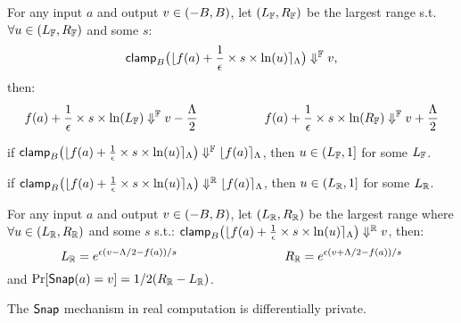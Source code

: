 \documentclass[a4paper,11pt]{article}
\begin{document}
\begin{lem}[roundRL]
\label{lem:roundrl}
For any input $a$ and output $v \in (-B, B)$,
let $(L_{\mathbb{F}}, R_{\mathbb{F}})$ be the largest range s.t. 
$\forall u \in (L_{\mathbb{F}}, R_{\mathbb{F}})$ and some $s$:
%
$$
\mathsf{clamp}_B \big(
	\lfloor f(a) + \frac{1}{\epsilon} \times s \times \ln (u) \rceil_{\Lambda}
	\big)
	\Downarrow^{\mathbb{F}} v,$$
then:
$$
f(a) + \frac{1}{\epsilon} \times s \times 
\ln (L_{\mathbb{F}})
\Downarrow^{\mathbb{F}} v - \frac{\Lambda}{2}
~~~~~~~~~~~~~~~~
f(a) + \frac{1}{\epsilon} \times s \times 
\ln (R_{\mathbb{F}})
\Downarrow^{\mathbb{F}} v + \frac{\Lambda}{2}
$$
\end{lem}
\begin{lem}[roundId]
\label{lem:roundid}
if 
$\mathsf{clamp}_B \big(
	\lfloor f(a) + \frac{1}{\epsilon} \times s \times \ln (u) \rceil_{\Lambda}
	\big)
	\Downarrow^{\mathbb{F}} \lfloor f(a) \rceil_{\Lambda}$, then $u \in (L_{\mathbb{F}}, 1]$ for some $L_{\mathbb{F}}$.
\item
if
$\mathsf{clamp}_B \big(
	\lfloor f(a) + \frac{1}{\epsilon} \times s \times \ln (u) \rceil_{\Lambda}
	\big)
	\Downarrow^{\mathbb{R}} \lfloor f(a) \rceil_{\Lambda}$, then $u \in (L_{\mathbb{R}}, 1]$ for some $L_{\mathbb{R}}$.
\end{lem}
\begin{lem}[idealRL]
\label{lem:idealrl}
For any input $a$ and output $v \in (-B, B)$,
let $(L_{\mathbb{R}}, R_{\mathbb{R}})$ be the largest range where 
$\forall u \in (L_{\mathbb{R}}, R_{\mathbb{R}})$ and some $s$ s.t.:
%
$\mathsf{clamp}_B \big(
	\lfloor f(a) + \frac{1}{\epsilon} \times s \times \ln (u) \rceil_{\Lambda}
	\big)
\Downarrow^{\mathbb{R}} v
$, then:
%
$$
L_{\mathbb{R}} = e^{\epsilon(v - \Lambda/2 - f(a))/s}
~~~~~~~~~~~~~~~~~~~~~~~~~~
R_{\mathbb{R}} = e^{\epsilon(v + \Lambda/2 - f(a))/s}
$$
and 
$\Pr[\mathsf{Snap}(a) = v] = 1/2(R_{\mathbb{R}} - L_{\mathbb{R}})$.
\end{lem}

\begin{lem}[idealDP]
\label{lem:idealdp}
The $\mathsf{Snap}$ mechanism in real computation is differentially private.
\end{lem}
\end{document}
